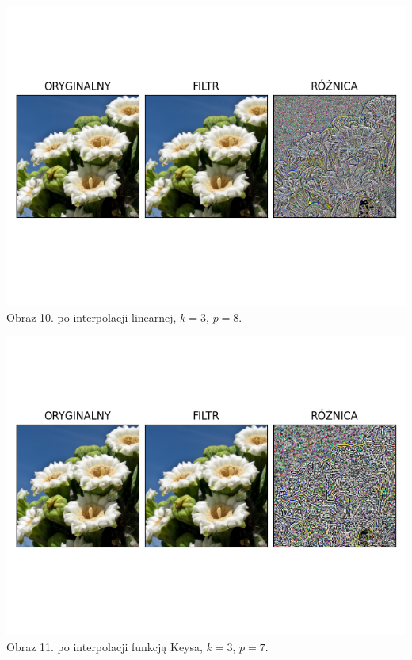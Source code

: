 \documentclass[14pt]{article}
\begin{document}
\begin{center}
    \includegraphics[scale=0.7]{images/lin_k3_p8.png}
    \\ \small Obraz 10. po interpolacji linearnej,
    $k=3$, $p=8$.

    \includegraphics[scale=0.7]{images/keys_k3_p7.png}
    \\ \small Obraz 11. po interpolacji funkcją Keysa,
    $k=3$, $p=7$.


\end{center}
\end{document}
